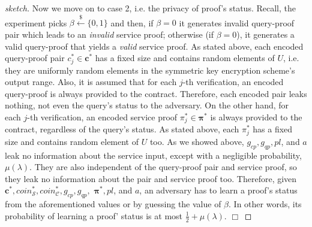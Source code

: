 \begin{proof}[sketch]
Now we move on to  case 2, i.e. the privacy of proof's status. Recall, the experiment  picks $\beta\stackrel{\scriptscriptstyle\$}\leftarrow \{0,1\}$ and then, if $\beta=0$ it  generates invalid query-proof pair which leads to an \emph{invalid} service proof; otherwise (if $\beta=0$), it  generates a valid query-proof that  yields a \emph{valid} service proof.  As stated above, each encoded query-proof pair $c^{\scriptscriptstyle *}_{\scriptscriptstyle j}\in\bm{c}^{\scriptscriptstyle *}$ has a fixed size and contains random elements of $U$, i.e. they are uniformly random elements in the symmetric key encryption scheme's output range. Also, it is assumed that for each $j$-th verification, an encoded query-proof is always provided to the contract. Therefore, each encoded pair leaks nothing, not even the query's status to the adversary. On the other hand, for each $j$-th verification, an encoded service proof $\pi_{\scriptscriptstyle j}^{\scriptscriptstyle *}\in\bm{\pi}^{\scriptscriptstyle *}$ is always provided to the contract, regardless of the query's status. As stated above, each $\pi_{\scriptscriptstyle j}^{\scriptscriptstyle *}$ has a fixed size and contains random element of $U$ too.   As we showed above, $g_{\scriptscriptstyle cp},  g_{\scriptscriptstyle qp},pl$, and $a$ leak no information about the service input, except with a negligible probability, $\mu(\lambda)$. They are also independent of the query-proof pair and service proof, so they leak no information about the pair and service proof too. Therefore, given   $\bm{c}^{\scriptscriptstyle *},coin^{\scriptscriptstyle *}_{\scriptscriptstyle \mathcal S},coin^{\scriptscriptstyle *}_{\scriptscriptstyle\mathcal C}, g_{\scriptscriptstyle cp},  g_{\scriptscriptstyle qp},$  $\bm{\pi}^{\scriptscriptstyle *},pl$, and $a$, an adversary has to learn a proof's status from the aforementioned values or by guessing the value of $\beta$. In other words, its probability of learning a proof' status is at most $\frac{1}{2}+\mu(\lambda)$.
 \hfill\(\Box\)\end{proof}



%
%
%



